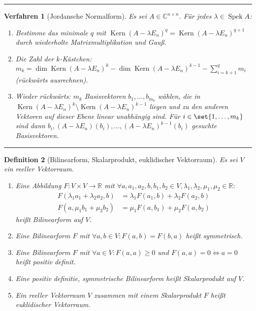\documentclass[a4paper]{article}
\newcounter{Sec}
\theoremstyle{marginbreak}
\newtheorem{definition}{Definition}[Sec]
\newtheorem{verfahren}[definition]{Verfahren}
\DeclareMathOperator{\Kern}{Kern}
\DeclareMathOperator{\Spek}{Spek}
\newcommand{\sep}{%
	\rule{\textwidth}{0.3pt}%
	\stepcounter{Sec}%
	}
\begin{document}
	\sep
	\begin{verfahren}[Jordansche Normalform]
		Es sei $A\in\mathbb{C}^{n\times n}$. Für jedes $\lambda\in\Spek A$:
		\begin{enumerate}
			\item Bestimme das minimale $q$ mit $\Kern(A-\lambda E_n)^q = \Kern(A-\lambda E_n)^{q+1}$
			durch wiederholte Matrixmultiplikation und Gauß.
			\item Die Zahl der $k$-Kästchen: $m_k = \dim\Kern(A-\lambda E_n)^k - \dim\Kern(A-\lambda E_n)^{k - 1} - \sum_{i=k+1}^q m_i$
			(rückwärts ausrechnen).
			\item Wieder rückwärts: $m_k$ Basisvektoren $b_1, \ldots, b_{m_k}$ wählen, die in $\Kern(A-\lambda E_n)^k \setminus \Kern(A-\lambda E_n)^{k - 1}$
			liegen und zu den anderen Vektoren auf dieser Ebene linear unabhängig sind. Für $i\in\set{1,\ldots,m_k}$ sind dann
			$b_i, (A-\lambda E_n)(b_i), \ldots, (A-\lambda E_n)^{k - 1}(b_i)$ gesuchte Basisvektoren.
		\end{enumerate}
	\end{verfahren}
	\sep
	\begin{definition}[Bilinearform, Skalarprodukt, euklidischer Vektorraum]
		Es sei $V$ ein reeller Vektorraum.
		\begin{enumerate}[label=(\alph*)]
			\item Eine Abbildung $F\colon V\times V\to\mathbb{R}$ mit
				$\forall a, a_1, a_2, b, b_1, b_2\in V, \lambda_1, \lambda_2, \mu_1, \mu_2\in\mathbb{R}\colon$
				\begin{align*}
					F(\lambda_1 a_1+\lambda_2 a_2, b) &= \lambda_1 F(a_1, b) + \lambda_2 F(a_2, b)\\
					F(a, \mu_1 b_1 + \mu_2 b_2) &= \mu_1 F(a, b_1) + \mu_2 F(a, b_2)
				\end{align*}
				heißt Bilinearform auf $V$.
			\item Eine Bilinearform $F$ mit $\forall a, b\in V\colon F(a, b) = F(b, a)$ heißt symmetrisch.
			\item Eine Bilinearform $F$ mit $\forall a\in V\colon F(a, a)\geq0$ und $F(a, a)=0\iff a = 0$ heißt
				positiv definit.
			\item Eine positiv definitie, symmetrische Bilinearform heißt Skalarprodukt auf $V$.
			\item Ein reeller Vektorraum $V$ zusammen mit einem Skalarprodukt $F$ heißt euklidischer Vektorraum.
		\end{enumerate}
	\end{definition}
\end{document}
